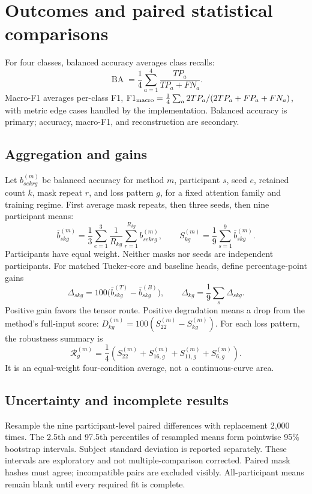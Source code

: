 \documentclass[11pt,a4paper]{article}
\begin{document}
\clearpage
\section{Outcomes and paired statistical comparisons}
For four classes, balanced accuracy averages class recalls:
\begin{equation}
 \operatorname{BA}=\frac14\sum_{a=1}^4\frac{TP_a}{TP_a+FN_a}.
\end{equation}
Macro-F1 averages per-class F1,
\(\operatorname{F1}_{\rm macro}=\frac14\sum_a
2TP_a/(2TP_a+FP_a+FN_a)\), with metric edge cases handled by the implementation.
Balanced accuracy is primary; accuracy, macro-F1, and reconstruction are secondary.

\subsection{Aggregation and gains}
Let \(b^{(m)}_{sekrg}\) be balanced accuracy for method \(m\), participant \(s\),
seed \(e\), retained count \(k\), mask repeat \(r\), and loss pattern \(g\),
for a fixed attention family and training regime. First average mask repeats,
then three seeds, then nine participant means:
\begin{equation}
 \bar b^{(m)}_{skg}=\frac13\sum_{e=1}^3
   \frac1{R_{kg}}\sum_{r=1}^{R_{kg}}b^{(m)}_{sekrg},\qquad
 S^{(m)}_{kg}=\frac19\sum_{s=1}^9\bar b^{(m)}_{skg}.
\end{equation}
Participants have equal weight. Neither masks nor seeds are independent participants.
For matched Tucker-core and baseline heads, define percentage-point gains
\begin{equation}
 \Delta_{skg}=100\bigl(\bar b^{(T)}_{skg}-\bar b^{(B)}_{skg}\bigr),\qquad
 \Delta_{kg}=\frac19\sum_s\Delta_{skg}.
\end{equation}
Positive gain favors the tensor route. Positive degradation means a drop from
the method's full-input score:
\(D^{(m)}_{kg}=100(S^{(m)}_{22}-S^{(m)}_{kg})\).
For each loss pattern, the robustness summary is
\begin{equation}
 \mathcal R^{(m)}_g=\frac14\left(S^{(m)}_{22}+S^{(m)}_{16,g}
                    +S^{(m)}_{11,g}+S^{(m)}_{6,g}\right).
\end{equation}
It is an equal-weight four-condition average, not a continuous-curve area.

\subsection{Uncertainty and incomplete results}
Resample the nine participant-level paired differences with replacement 2,000
times. The 2.5th and 97.5th percentiles of resampled means form pointwise 95\%
bootstrap intervals. Subject standard deviation is reported separately.
These intervals are exploratory and not multiple-comparison corrected.
Paired mask hashes must agree; incompatible pairs are excluded visibly.
All-participant means remain blank until every required fit is complete.
\end{document}
